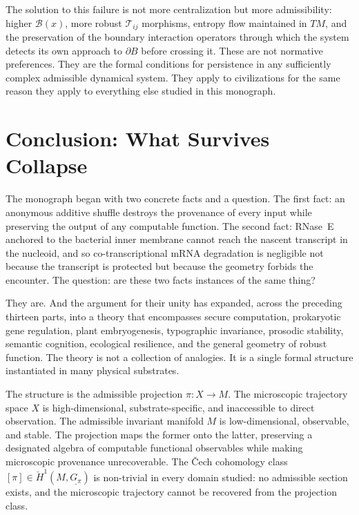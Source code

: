 \documentclass[12pt, a4paper]{article}
\theoremstyle{essaystyle}
\begin{document}
The solution to this failure is not more centralization but more admissibility: higher
$\mathcal{B}(x)$, more robust $\mathcal{T}_{ij}$ morphisms, entropy flow maintained
in $TM$, and the preservation of the boundary interaction operators through which
the system detects its own approach to $\partial B$ before crossing it. These are
not normative preferences. They are the formal conditions for persistence in any
sufficiently complex admissible dynamical system. They apply to civilizations for
the same reason they apply to everything else studied in this monograph.

\section{Conclusion: What Survives Collapse}

The monograph began with two concrete facts and a question. The first fact: an
anonymous additive shuffle destroys the provenance of every input while preserving
the output of any computable function. The second fact: RNase~E anchored to the
bacterial inner membrane cannot reach the nascent transcript in the nucleoid, and
so co-transcriptional mRNA degradation is negligible not because the transcript is
protected but because the geometry forbids the encounter. The question: are these
two facts instances of the same thing?

They are. And the argument for their unity has expanded, across the preceding
thirteen parts, into a theory that encompasses secure computation, prokaryotic
gene regulation, plant embryogenesis, typographic invariance, prosodic stability,
semantic cognition, ecological resilience, and the general geometry of robust
function. The theory is not a collection of analogies. It is a single formal
structure instantiated in many physical substrates.

The structure is the admissible projection $\pi : X \to M$. The microscopic
trajectory space $X$ is high-dimensional, substrate-specific, and inaccessible
to direct observation. The admissible invariant manifold $M$ is low-dimensional,
observable, and stable. The projection maps the former onto the latter, preserving
a designated algebra of computable functional observables while making microscopic
provenance unrecoverable. The Čech cohomology class $[\pi] \in \check{H}^1(M,
\underline{G_\pi})$ is non-trivial in every domain studied: no admissible section
exists, and the microscopic trajectory cannot be recovered from the projection class.
\end{document}
